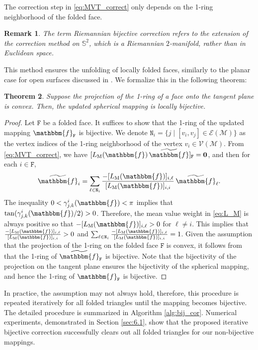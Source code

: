 \documentclass{article}
\numberwithin{equation}{section}
\newtheorem{theorem}{Theorem}
\newtheorem{remark}[theorem]{Remark}
\def\0{\mathbf{0}}
\def\bf{\mathbbm{f}}
\def\E{\mathcal{E}}
\def\bF{\mathtt{F}}
\def\M{\mathcal{M}}
\def\bN{\mathtt{N}}
\def\V{\mathcal{V}}
\begin{document}
The correction step in \eqref{eq:MVT_correct} only depends on the 1-ring neighborhood of the folded face.

{
\begin{remark}
The term Riemannian bijective correction refers to the extension of the correction method on $\mathbb{S}^2$, which is a Riemannian $2$-manifold, rather than in Euclidean space.
\end{remark}
}

This method ensures the unfolding of locally folded faces, similarly to the planar case for open surfaces discussed in \cite{Yueh23}. We formalize this in the following theorem:
\begin{theorem} \label{thm:bij_cor}
Suppose the projection of the 1-ring of a face onto the tangent plane is convex. Then, the updated spherical mapping is locally bijective.

\end{theorem}
\begin{proof}
Let $\bF$ be a folded face. It suffices to show that the 1-ring of the updated mapping $\bf_{\bF}$ is bijective. 
We denote $\bN_i=\{ j \mid [v_i,v_j]\in\E(\M) \}$ as the vertex indices of the 1-ring neighborhood of the vertex $v_i\in\V(\M)$. 
From \eqref{eq:MVT_correct}, we have $[L_\mathrm{M}(\bf)\, \widetilde \bf]_\bF = \0$, and then for each $i\in\bF$,
$$
\widetilde \bf_i = \sum_{\ell\in\bN_i} \frac{-[L_\mathrm{M}(\bf)]_{i,\ell}}{[L_\mathrm{M}(\bf)]_{i,i}} \, \widetilde \bf_\ell.
$$
The inequality $0 < \gamma_{j,k}^i (\bf) < \pi$ implies that $\tan (\gamma_{j,k}^i(\bf) /2) > 0$. Therefore, the mean value weight in \eqref{eq:L_M} is always positive so that $-[L_\mathrm{M}(\bf)]_{i,\ell}>0$ for $\ell\neq i$. 
This implies that $\frac{-[L_\mathrm{M}(\bf)]_{i,\ell}}{[L_\mathrm{M}(\bf)]_{i,i}}>0$ and $\sum_{\ell\in\bN_i}\frac{-[L_\mathrm{M}(\bf)]_{i,\ell}}{[L_\mathrm{M}(\bf)]_{i,i}}=1$.
Given the assumption that the projection of the 1-ring on the folded face $\bF$ is convex, it follows from \cite[Theorem 4.1]{Floa03} that the 1-ring of $\widetilde{\bf}_{\bF}$ is bijective. Note that the bijectivity of the projection on the tangent plane ensures the bijectivity of the spherical mapping, and hence the 1-ring of $\bf_{\bF}$ is bijective.
\end{proof}

In practice, the assumption may not always hold, therefore, this procedure is repeated iteratively for all folded triangles until the mapping becomes bijective. The detailed procedure is summarized in Algorithm \ref{alg:bij_cor}. Numerical experiments, demonstrated in Section \ref{sec:6.1}, show that the proposed iterative bijective correction successfully clears out all folded triangles for our non-bijective mappings.
\end{document}
